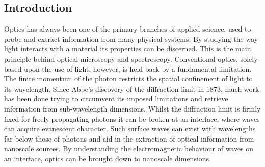 \documentclass[12pt, a4paper, twoside]{book}
\begin{document}
\begin{singlespace}
\color{white}\chapter{Introduction}
\end{singlespace}


Optics has always been one of the primary branches of applied science, used to probe and extract information from many physical systems. By studying the way light interacts with a material its properties can be discerned. This is the main principle behind optical microscopy and spectroscopy. Conventional optics, solely based upon the use of light, however, is held back by a fundamental limitation. The finite momentum of the photon restricts the spatial confinement of light to its wavelength. Since Abbe's discovery of the diffraction limit in 1873, much work has been done trying to circumvent its imposed limitations and retrieve information from sub-wavelength dimensions. Whilst the diffraction limit is firmly fixed for freely propagating photons it can be broken at an interface, where waves can acquire evanescent character. Such surface waves can exist with wavelengths far below those of photons and aid in the extraction of optical information from nanoscale sources. By understanding the electromagnetic behaviour of waves on an interface, optics can be brought down to nanoscale dimensions.
\end{document}
